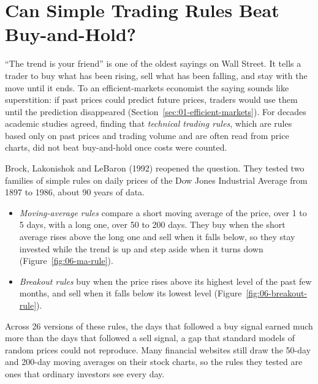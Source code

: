 \makeatletter
\makeatother

\chapter{Can Simple Trading Rules Beat Buy-and-Hold?}
\label{ch:05}
\providecommand{\term}[1]{\emph{#1}}

``The trend is your friend'' is one of the oldest sayings on Wall Street. It tells a trader to buy what has been rising, sell what has been falling, and stay with the move until it ends. To an efficient-markets economist the saying sounds like superstition: if past prices could predict future prices, traders would use them until the prediction disappeared (Section~\ref{sec:01-efficient-markets}). For decades academic studies agreed, finding that \term{technical trading rules}, which are rules based only on past prices and trading volume and are often read from price charts, did not beat buy-and-hold once costs were counted. 

Brock, Lakonishok and LeBaron (1992) reopened the question. They tested two families of simple rules on daily prices of the Dow Jones Industrial Average from 1897 to 1986, about 90 years of data. 
\begin{itemize}
\item \term{Moving-average rules} compare a short moving average of the price, over 1 to 5 days, with a long one, over 50 to 200 days. They buy when the short average rises above the long one and sell when it falls below, so they stay invested while the trend is up and step aside when it turns down (Figure~\ref{fig:06-ma-rule}). 
\item \term{Breakout rules} buy when the price rises above its highest level of the past few months, and sell when it falls below its lowest level (Figure~\ref{fig:06-breakout-rule}).
\end{itemize}
Across 26 versions of these rules, the days that followed a buy signal earned much more than the days that followed a sell signal, a gap that standard models of random prices could not reproduce. Many financial websites still draw the 50-day and 200-day moving averages on their stock charts, so the rules they tested are ones that ordinary investors see every day.

